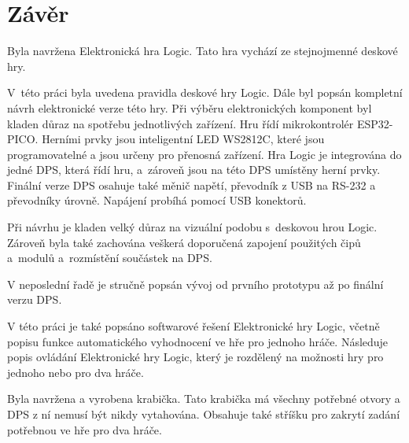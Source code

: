 \chapter*{Závěr}
{}

Byla navržena Elektronická hra Logic. Tato hra vychází ze stejnojmenné deskové hry.

V~této práci byla uvedena pravidla deskové hry Logic. Dále byl popsán kompletní návrh elektronické verze této hry. Při výběru elektronických 
komponent byl kladen důraz na spotřebu jednotlivých zařízení. Hru řídí mikrokontrolér ESP32-PICO. Herními prvky jsou inteligentní LED WS2812C, 
které jsou programovatelné a jsou určeny pro přenosná zařízení. Hra Logic je integrována do jedné DPS, která řídí hru, a~zároveň jsou na této 
DPS umístěny herní prvky. Finální verze DPS osahuje také měnič napětí, převodník z USB na RS-232 a převodníky úrovně. Napájení probíhá pomocí
USB konektorů.

Při návrhu je kladen velký důraz na vizuální podobu s~deskovou hrou Logic. Zároveň byla také zachována veškerá doporučená zapojení použitých 
čipů a~modulů a~rozmístění součástek na DPS.

V neposlední řadě je stručně popsán vývoj od prvního prototypu až po finální verzu DPS. 

V této práci je také popsáno softwarové řešení Elektronické hry Logic, včetně popisu funkce automatického vyhodnocení ve hře pro jednoho hráče.
Následuje popis ovládání Elektronické hry Logic, který je rozdělený na možnosti hry pro jednoho nebo pro dva hráče. 

Byla navržena a vyrobena krabička. Tato krabička má všechny potřebné otvory a DPS z ní nemusí být nikdy vytahována. Obsahuje také stříšku pro
zakrytí zadání potřebnou ve hře pro dva hráče. 
